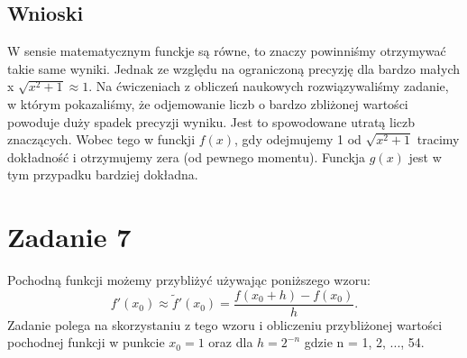 \documentclass{article}
\begin{document}
\subsection*{Wnioski} W sensie matematycznym funckje są równe, to znaczy powinniśmy otrzymywać takie same wyniki. Jednak ze względu na ograniczoną precyzję dla bardzo małych x $\sqrt{x^2 + 1} \approx 1$. Na ćwiczeniach z obliczeń naukowych rozwiązywaliśmy zadanie, w którym pokazaliśmy, że odjemowanie liczb o bardzo zbliżonej wartości powoduje duży spadek precyzji wyniku. Jest to spowodowane utratą liczb znaczących. Wobec tego w funckji $f(x)$, gdy odejmujemy 1 od $\sqrt{x^2 + 1}$ tracimy dokładność i otrzymujemy zera (od pewnego momentu). Funckja $g(x)$ jest w tym przypadku bardziej dokładna.

\section{Zadanie 7}
Pochodną funkcji możemy przybliżyć używając poniższego wzoru:\\
\[
f'(x_0) \approx \tilde{f}'(x_0) = \frac{f(x_0 + h) - f(x_0)}{h}.
\]
Zadanie polega na skorzystaniu z tego wzoru i obliczeniu przybliżonej wartości pochodnej funkcji w punkcie $x_0 = 1$ oraz dla $h = 2^{-n}$ gdzie n = {1, 2, ..., 54}.\\\\
\end{document}
